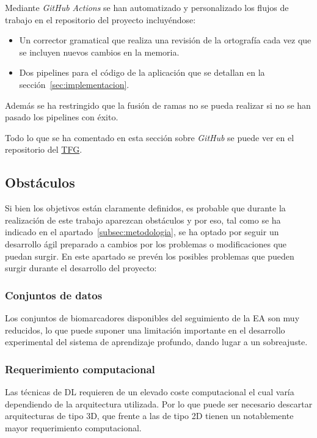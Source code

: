 Mediante \textit{GitHub Actions} se han automatizado y personalizado los flujos de trabajo en el repositorio del proyecto
incluyéndose:
\begin{itemize}
    \item Un corrector gramatical que realiza una revisión de la ortografía cada vez que se incluyen nuevos cambios en
    la memoria.
    \item Dos pipelines para el código de la aplicación que se detallan en la sección~\ref{sec:implementacion}.\\
\end{itemize}

Además se ha restringido que la fusión de ramas no se pueda realizar si no se han pasado los pipelines con éxito.

Todo lo que se ha comentado en esta sección sobre \textit{GitHub} se puede ver en el repositorio del
\href{https://github.com/raquelmolinare/TFG}{TFG}.

\subsection{Obstáculos}\label{subsec:obstaculos}
Si bien los objetivos están claramente definidos, es probable que durante la realización de este trabajo aparezcan 
obstáculos y por eso, tal como se ha indicado en el apartado~\ref{subsec:metodologia}, se ha optado por seguir un
desarrollo ágil preparado a cambios por los problemas o modificaciones que puedan surgir.
En este apartado se prevén los posibles problemas que pueden surgir durante el desarrollo del proyecto:

\subsubsection{Conjuntos de datos}
Los conjuntos de biomarcadores disponibles del seguimiento de la EA son muy reducidos, lo que puede suponer una
limitación importante en el desarrollo experimental del sistema de aprendizaje profundo, dando lugar a un sobreajuste.

\subsubsection{Requerimiento computacional}
Las técnicas de DL requieren de un elevado coste computacional el cual varía dependiendo de la arquitectura utilizada.
Por lo que puede ser necesario descartar arquitecturas de tipo 3D, que frente a las de tipo 2D tienen un notablemente
mayor requerimiento computacional.


